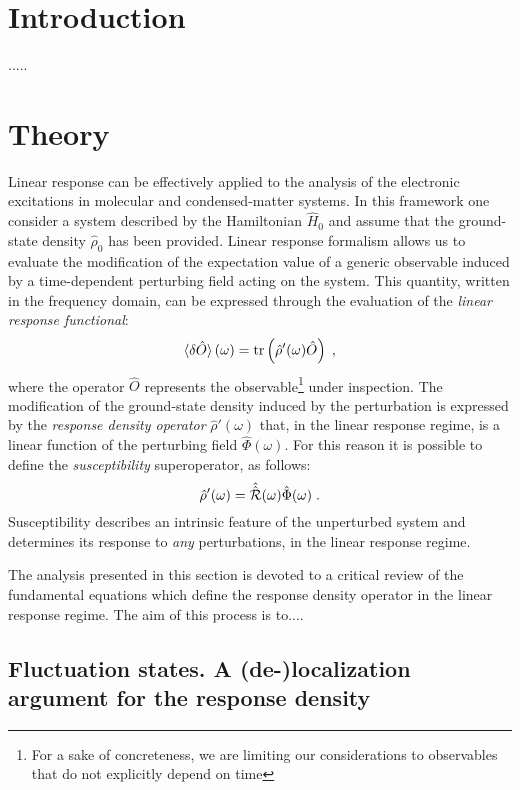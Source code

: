 \documentclass[reprint,aps,prb]{revtex4-1}
\newcommand{\be}{\begin{equation}}
\newcommand{\ee}{\end{equation}}
\newcommand{\lb}{\label}
\newcommand{\op}[1]{\hat {#1}}
\newcommand{\sop}[1]{\op{\op {#1}}}
\newcommand{\trace}[1]{\mathrm{tr}\left(#1\right)}
\newcommand{\dmnot}{\op{\rho}_0}
\newcommand{\dm}{\op{\rho}}
\newcommand{\hnot}{\op{H}_0}
\begin{document}
\section{Introduction}

.....

\section{Theory}

Linear response can be effectively applied to the analysis of the electronic excitations in molecular and condensed-matter systems. In this framework one consider a system 
described by the Hamiltonian $\hnot$ and assume that the ground-state density $\dmnot$ has been provided. Linear response formalism allows us to evaluate the modification 
of the expectation value of a generic observable induced by a time-dependent perturbing field acting on the system. This quantity, written in the frequency domain, can be expressed 
through the evaluation of the \emph{linear response functional}:
\be\lb{LinearResponseFunctDef1}
\braket{\delta\op O}(\omega) = \trace{\dm'(\omega)\op O} \;,
\ee
where the operator $\op O$ represents the observable\footnote{For a sake of concreteness, we are limiting our considerations to observables that do not explicitly depend on time} 
under inspection. The modification of the ground-state density induced by the perturbation is expressed by the \emph{response density operator} $\dm'(\omega)$ that, in the linear 
response regime, is a linear function of the perturbing field $\op\Phi(\omega)$. For this reason it is possible to define the \emph{susceptibility} superoperator, as follows:
\be\lb{SusceptibilityDef1}
\dm'(\omega) = \sop{{\cal R}}(\omega) \op\Phi(\omega) \;. 
\ee
Susceptibility describes an intrinsic feature of the unperturbed system and determines its response to \emph{any} perturbations, in the linear response regime.

The analysis presented in this section is devoted to a critical review of the fundamental equations which define the response density operator in the linear response regime.    
The aim of this process is to....


\subsection{Fluctuation states. A (de-)localization argument for the response density}
\end{document}
